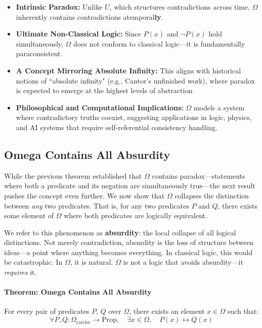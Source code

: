 \documentclass[12pt]{article}
\begin{document}
\begin{itemize}
    \item \textbf{Intrinsic Paradox:} Unlike \( U \), which structures contradictions across time, \( \Omega \) inherently contains contradictions atemporal\textbf{ly}. 
    \item \textbf{Ultimate Non-Classical Logic:} Since \( P(x) \) and \( \neg P(x) \) hold simultaneously, \( \Omega \) does not conform to classical logic—it is fundamentally paraconsistent.
    \item \textbf{A Concept Mirroring Absolute Infinity:} This aligns with historical notions of ``absolute infinity" (e.g., Cantor’s unfinished work), where paradox is expected to emerge at the highest levels of abstraction.
    \item \textbf{Philosophical and Computational Implications:} \( \Omega \) models a system where contradictory truths coexist, suggesting applications in logic, physics, and AI systems that require self-referential consistency handling.
\end{itemize}


\subsection{Omega Contains All Absurdity}

While the previous theorem established that \( \Omega \) contains paradox—statements where both a predicate and its negation are simultaneously true—the next result pushes the concept even further. We now show that \( \Omega \) collapses the distinction between \textit{any} two predicates. That is, for any two predicates \( P \) and \( Q \), there exists some element of \( \Omega \) where both predicates are logically equivalent.

We refer to this phenomenon as \textbf{absurdity}: the local collapse of all logical distinctions. Not merely contradiction, absurdity is the loss of structure between ideas—a point where anything becomes everything. In classical logic, this would be catastrophic. In \( \Omega \), it is natural. \( \Omega \) is not a logic that avoids absurdity—it \textit{requires} it.

\paragraph{Theorem: Omega Contains All Absurdity}  
For every pair of predicates \( P \), \( Q \) over \( \Omega \), there exists an element \( x \in \Omega \) such that:
\[
\forall P, Q : \Omega_{\text{carrier}} \to \text{Prop}, \quad \exists x \in \Omega, \quad P(x) \leftrightarrow Q(x)
\]
\end{document}
